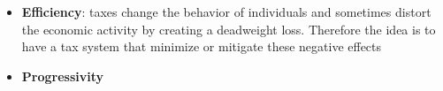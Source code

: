 \documentclass[
  ignorenonframetext,
]{beamer}
\providecommand{\tightlist}{%
  \setlength{\itemsep}{0pt}\setlength{\parskip}{0pt}}\usepackage{longtable,booktabs,array}
\begin{document}
\begin{frame}{}
\label{section-16}
\begin{itemize}
\tightlist
\item
  \textbf{Efficiency}: taxes change the behavior of individuals and
  sometimes distort the economic activity by creating a deadweight loss.
  Therefore the idea is to have a tax system that minimize or mitigate
  these negative effects
\end{itemize}
\end{frame}

\begin{frame}{}
\label{section-17}
\begin{itemize}
\tightlist
\item
  \textbf{Progressivity}
\end{itemize}

\footnotesize

\begin{figure}

\begin{minipage}{0.45\linewidth}



\end{minipage}%
%
\begin{minipage}{0.10\linewidth}
~\end{minipage}%
%
\begin{minipage}{0.45\linewidth}

\end{minipage}
\end{figure}
\end{frame}
\end{document}
